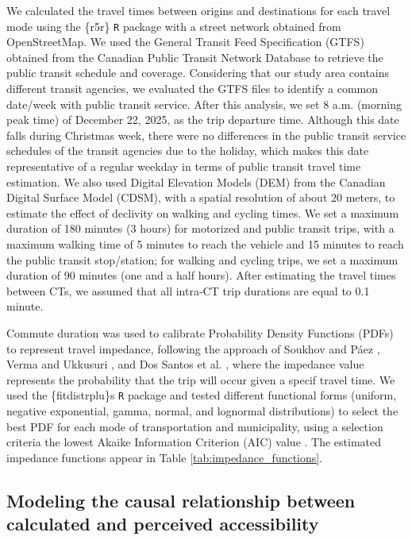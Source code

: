 \documentclass[preprint, 3p,
authoryear]{elsarticle} %
\begin{document}
We calculated the travel times between origins and destinations for each
travel mode using the \{r5r\} \texttt{R} package \citep{pereira2021a}
with a street network obtained from OpenStreetMap. We used the General
Transit Feed Specification (GTFS) obtained from the Canadian Public
Transit Network Database \citep{statisticscanada} to retrieve the public
transit schedule and coverage. Considering that our study area contains
different transit agencies, we evaluated the GTFS files to identify a
common date/week with public transit service. After this analysis, we
set 8 a.m. (morning peak time) of December 22, 2025, as the trip
departure time. Although this date falls during Christmas week, there
were no differences in the public transit service schedules of the
transit agencies due to the holiday, which makes this date
representative of a regular weekday in terms of public transit travel
time estimation. We also used Digital Elevation Models (DEM) from the
Canadian Digital Surface Model (CDSM), with a spatial resolution of
about 20 meters, to estimate the effect of declivity on walking and
cycling times. We set a maximum duration of 180 minutes (3 hours) for
motorized and public transit trips, with a maximum walking time of 5
minutes to reach the vehicle and 15 minutes to reach the public transit
stop/station; for walking and cycling trips, we set a maximum duration
of 90 minutes (one and a half hours). After estimating the travel times
between CTs, we assumed that all intra-CT trip durations are equal to
0.1 minute.

Commute duration was used to calibrate Probability Density Functions
(PDFs) to represent travel impedance, following the approach of Soukhov
and Páez \citeyearpar{soukhov2024a}, Verma and Ukkusuri
\citeyearpar{verma2025}, and Dos Santos et al.
\citeyearpar{dossantos2026}, where the impedance value represents the
probability that the trip will occur given a specif travel time. We used
the \{fitdistrplu\}s \texttt{R} package \citep{delignette-muller2015}
and tested different functional forms (uniform, negative exponential,
gamma, normal, and lognormal distributions) to select the best PDF for
each mode of transportation and municipality, using a selection criteria
the lowest Akaike Information Criterion (AIC) value \citep{akaike1974}.
The estimated impedance functions appear in Table
\ref{tab:impedance_functions}.

\subsection{Modeling the causal relationship between calculated and
perceived
accessibility}\label{modeling-the-causal-relationship-between-calculated-and-perceived-accessibility}
\end{document}
